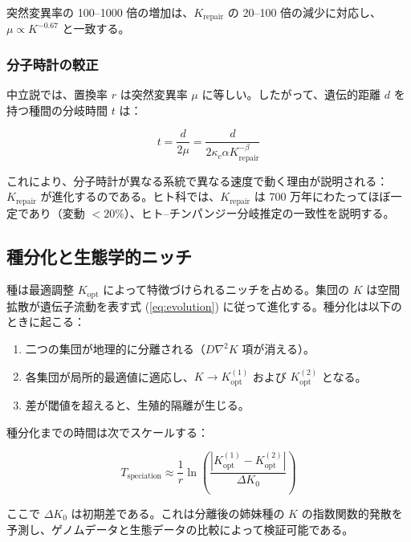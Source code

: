 \documentclass[12pt,a4paper]{article}
\newcommand{\Keffopt}{K_{\mathrm{opt}}}
\newcommand{\kappac}{\kappa_c}
\theoremstyle{remark}
\begin{document}
	突然変異率の 100--1000 倍の増加は、\(K_{\text{repair}}\) の 20--100 倍の減少に対応し、\(\mu \propto K^{-0.67}\) と一致する。
	
	\subsubsection{分子時計の較正}
	
	中立説では、置換率 \(r\) は突然変異率 \(\mu\) に等しい。したがって、遺伝的距離 \(d\) を持つ種間の分岐時間 \(t\) は：
	
	\begin{equation}
		t = \frac{d}{2\mu} = \frac{d}{2\kappac \alpha K_{\text{repair}}^{-\beta}}
		\label{eq:molecular-clock}
	\end{equation}
	
	これにより、分子時計が異なる系統で異なる速度で動く理由が説明される：\(K_{\text{repair}}\) が進化するのである。ヒト科では、\(K_{\text{repair}}\) は 700 万年にわたってほぼ一定であり（変動 \(<20\%\)）、ヒト–チンパンジー分岐推定の一致性を説明する。
	
	\subsection{種分化と生態学的ニッチ}
	
	種は最適調整 \(\Keffopt\) によって特徴づけられるニッチを占める。集団の \(K\) は空間拡散が遺伝子流動を表す式 (\ref{eq:evolution}) に従って進化する。種分化は以下のときに起こる：
	
	\begin{enumerate}
		\item 二つの集団が地理的に分離される（\(D \nabla^2 K\) 項が消える）。
		\item 各集団が局所的最適値に適応し、\(K \to \Keffopt^{(1)}\) および \(\Keffopt^{(2)}\) となる。
		\item 差が閾値を超えると、生殖的隔離が生じる。
	\end{enumerate}
	
	種分化までの時間は次でスケールする：
	
	\begin{equation}
		T_{\text{speciation}} \approx \frac{1}{r} \ln\left( \frac{|\Keffopt^{(1)} - \Keffopt^{(2)}|}{\Delta K_0} \right)
		\label{eq:speciation-time}
	\end{equation}
	
	ここで \(\Delta K_0\) は初期差である。これは分離後の姉妹種の \(K\) の指数関数的発散を予測し、ゲノムデータと生態データの比較によって検証可能である。
	
\end{document}
